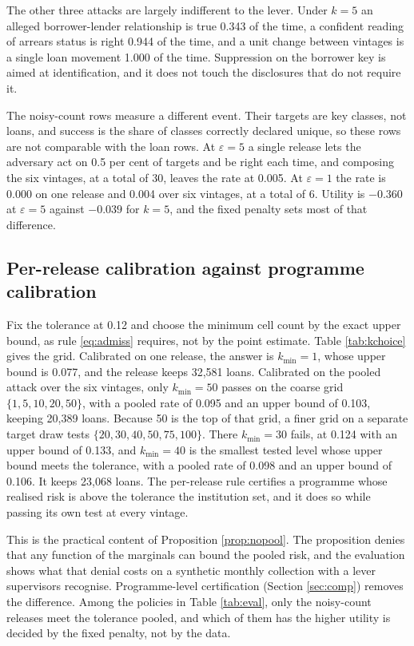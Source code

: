 \documentclass[11pt,a4paper]{article}
\theoremstyle{plain}
\theoremstyle{definition}
\begin{document}
The other three attacks are largely indifferent to the lever. Under $k=5$ an alleged
borrower-lender relationship is true 0.343 of the time, a
confident reading of arrears status is right 0.944 of the time,
and a unit change between vintages is a single loan movement 1.000
of the time. Suppression on the borrower key is aimed at identification, and it does
not touch the disclosures that do not require it.

The noisy-count rows measure a different event. Their targets are key classes,
not loans, and success is the share of classes correctly declared unique, so
these rows are not comparable with the loan rows. At $\varepsilon = 5$ a single
release lets the adversary act on 0.5 per cent of targets and be right each
time, and composing the six vintages, at a total of 30, leaves the rate at
0.005. At $\varepsilon = 1$ the rate is 0.000 on one release and 0.004 over six
vintages, at a total of 6. Utility is $-0.360$ at $\varepsilon = 5$ against
$-0.039$ for $k=5$, and the fixed penalty sets most of that difference.

\subsection{Per-release calibration against programme calibration}\label{sec:eval-programme}

Fix the tolerance at 0.12 and choose the minimum cell count by the exact upper
bound, as rule \eqref{eq:admiss} requires, not by the point estimate. Table
\ref{tab:kchoice} gives the grid. Calibrated on one release, the answer is
$k_{\min} = 1$, whose upper bound is 0.077, and the release keeps 32{,}581
loans. Calibrated on the pooled attack over the six vintages, only $k_{\min} =
50$ passes on the coarse grid $\{1, 5, 10, 20, 50\}$, with a pooled rate of
0.095 and an upper bound of 0.103, keeping 20{,}389 loans. Because 50 is the top
of that grid, a finer grid on a separate target draw tests $\{20, 30, 40, 50, 75,
100\}$. There $k_{\min} = 30$ fails, at 0.124 with an upper bound of 0.133, and
$k_{\min} = 40$ is the smallest tested level whose upper bound meets the
tolerance, with a pooled rate of 0.098 and an upper bound of 0.106. It keeps
23{,}068 loans. The per-release rule certifies a programme whose realised risk
is above the tolerance the institution set, and it does so while passing its own
test at every vintage.



This is the practical content of Proposition \ref{prop:nopool}. The proposition
denies that any function of the marginals can bound the pooled risk, and the
evaluation shows what that denial costs on a synthetic monthly collection with
a lever supervisors recognise. Programme-level certification (Section
\ref{sec:comp}) removes the difference. Among the policies in Table
\ref{tab:eval}, only the noisy-count releases meet the tolerance pooled, and
which of them has the higher utility is decided by the fixed penalty, not by the
data.
\end{document}
